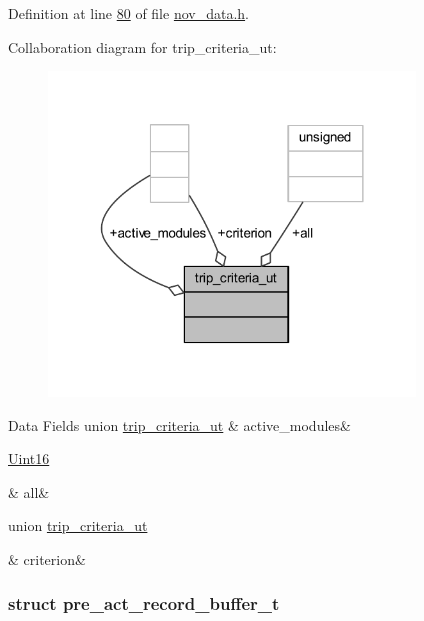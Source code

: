 Definition at line \hyperlink{a00022_source_l00080}{80} of file \hyperlink{a00022_source}{nov\+\_\+data.\+h}.



Collaboration diagram for trip\+\_\+criteria\+\_\+ut\+:\nopagebreak
\begin{figure}[H]
\begin{center}
\leavevmode
\includegraphics[width=276pt]{d5/d6c/a00977}
\end{center}
\end{figure}
\begin{DoxyFields}{Data Fields}
\hypertarget{a00022_aa887adf5322b4655895044fdd1f10acc}{union \hyperlink{a00022_d1/dea/a00829}{trip\+\_\+criteria\+\_\+ut}}\label{a00022_aa887adf5322b4655895044fdd1f10acc}
&
active\+\_\+modules&
\\
\hline

\hypertarget{a00022_a0bb3bfaeecd5a6042a359402ea9cddbb}{\hyperlink{a00072_a59a9f6be4562c327cbfb4f7e8e18f08b}{Uint16}}\label{a00022_a0bb3bfaeecd5a6042a359402ea9cddbb}
&
all&
\\
\hline

\hypertarget{a00022_a4c1d09fbf0947dae30c66adce2de6eb2}{union \hyperlink{a00022_d7/d5f/a00831}{trip\+\_\+criteria\+\_\+ut}}\label{a00022_a4c1d09fbf0947dae30c66adce2de6eb2}
&
criterion&
\\
\hline

\end{DoxyFields}
\label{da/dc3/a00657}
\hypertarget{a00022_da/dc3/a00657}{}
\subsubsection{struct pre\+\_\+act\+\_\+record\+\_\+buffer\+\_\+t}


